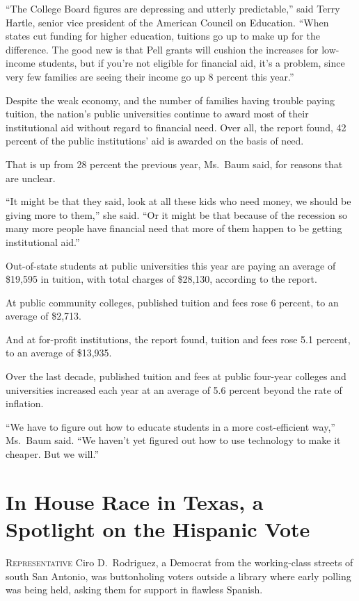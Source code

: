 ﻿\documentclass[12pt]{article}
\begin{document}
``The College Board figures are depressing and utterly predictable,'' said Terry Hartle, senior vice
president of the American Council on Education. ``When states cut funding for higher education,
tuitions go up to make up for the difference. The good new is that Pell grants will cushion the
increases for low-income students, but if you're not eligible for financial aid, it's a problem,
since very few families are seeing their income go up 8 percent this year.''

Despite the weak economy, and the number of families having trouble paying tuition, the nation's
public universities continue to award most of their institutional aid without regard to financial
need. Over all, the report found, 42 percent of the public institutions' aid is awarded on the basis
of need.

That is up from 28 percent the previous year, Ms.~Baum said, for reasons that are unclear.

``It might be that they said, look at all these kids who need money, we should be giving more to
them,'' she said. ``Or it might be that because of the recession so many more people have financial
need that more of them happen to be getting institutional aid.''

Out-of-state students at public universities this year are paying an average of \$19,595 in tuition,
with total charges of \$28,130, according to the report.

At public community colleges, published tuition and fees rose 6 percent, to an average of \$2,713.

And at for-profit institutions, the report found, tuition and fees rose 5.1 percent, to an average
of \$13,935.

Over the last decade, published tuition and fees at public four-year colleges and universities
increased each year at an average of 5.6 percent beyond the rate of inflation.

``We have to figure out how to educate students in a more cost-efficient way,'' Ms.~Baum said. ``We
haven't yet figured out how to use technology to make it cheaper. But we will.''

\section{In House Race in Texas, a Spotlight on the Hispanic Vote}

\lettrine{R}{epresentative} Ciro D.~Rodriguez, a Democrat from the
working-class streets of south San Antonio, was buttonholing voters outside a library where early
polling was being held, asking them for support in flawless Spanish.
\end{document}
